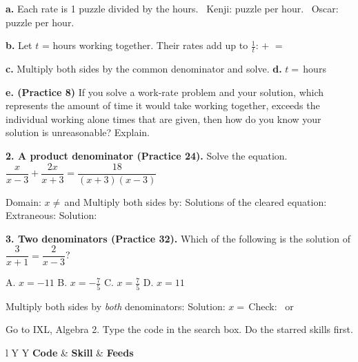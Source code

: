 \textbf{a.} Each rate is 1 puzzle divided by the hours. \ Kenji: \blank[1.4cm] puzzle per hour. \ Oscar: \blank[1.4cm] puzzle per hour.

\textbf{b.} Let $t$ = hours working together. Their rates add up to $\tfrac1t$: \quad \blank[1.4cm] $+$ \blank[1.4cm] $=$ \blank[1.4cm]

\begin{minipage}[t]{0.48\textwidth}
\vspace{0pt}\raggedright
\textbf{c.} Multiply both sides by the common denominator \blank[1.4cm] and solve.
\lines[3]
\textbf{d.} $t=$\,\blank[2cm] hours
\end{minipage}\hfill
\begin{minipage}[t]{0.48\textwidth}
\vspace{0pt}
\textbf{e. (Practice 8)} If you solve a work-rate problem and your solution, which represents the amount of time it would take working together, exceeds the individual working alone times that are given, then how do you know your solution is unreasonable? Explain.
\lines[2]
\end{minipage}

\vspace{3pt}
\textbf{2. A product denominator (Practice 24).} Solve the equation. \quad $\dfrac{x}{x-3}+\dfrac{2x}{x+3}=\dfrac{18}{(x+3)(x-3)}$

Domain: $x\neq$\,\blank[1.2cm] and \blank[1.2cm] \quad Multiply both sides by: \blank[2.6cm]
\lines[4]
Solutions of the cleared equation: \blank[2.4cm] \quad Extraneous: \blank[1.6cm] \quad Solution: \blank[1.6cm]

\vspace{3pt}
\textbf{3. Two denominators (Practice 32).} Which of the following is the solution of $\dfrac{3}{x+1}=\dfrac{2}{x-3}$?

\quad A. $x=-11$ \qquad B. $x=-\tfrac75$ \qquad C. $x=\tfrac75$ \qquad D. $x=11$

Multiply both sides by \emph{both} denominators: \blank[2.6cm]
\lines[3]
Solution: $x=$\,\blank[2cm] \quad Check: \checkmark\ or \texttimes

\newpage
{}
Go to IXL, Algebra 2. Type the code in the search box. Do the starred skills first.

\vspace{2pt}
\begin{tabularx}{\textwidth}{l Y Y}
\toprule
\textbf{Code} & \textbf{Skill} & \textbf{Feeds} \\
\midrule
{}
\bottomrule
\end{tabularx}

